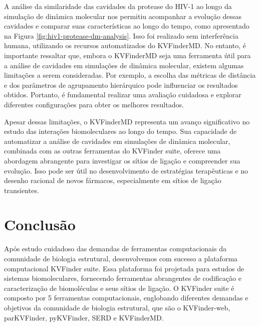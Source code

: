 \documentclass[Portugues]{phdquali}
\begin{document}
A análise da similaridade das cavidades da protease do HIV-1 ao longo da simulação de dinâmica molecular nos permitiu acompanhar a evolução dessas cavidades e comparar suas características ao longo do tempo, como apresentado na Figura \ref{fig:hiv1-protease-dm-analysis}. Isso foi realizado sem interferência humana, utilizando os recursos automatizados do KVFinderMD. No entanto, é importante ressaltar que, embora o KVFinderMD seja uma ferramenta útil para a análise de cavidades em simulações de dinâmica molecular, existem algumas limitações a serem consideradas. Por exemplo, a escolha das métricas de distância e dos parâmetros de agrupamento hierárquico pode influenciar os resultados obtidos. Portanto, é fundamental realizar uma avaliação cuidadosa e explorar diferentes configurações para obter os melhores resultados. %

Apesar dessas limitações, o KVFinderMD representa um avanço significativo no estudo das interações biomoleculares ao longo do tempo. Sua capacidade de automatizar a análise de cavidades em simulações de dinâmica molecular, combinada com as outras ferramentas do KVFinder suite, oferece uma abordagem abrangente para investigar os sítios de ligação e compreender sua evolução. Isso pode ser útil no desenvolvimento de estratégias terapêuticas e no desenho racional de novos fármacos, especialmente em sítios de ligação transientes.



\chapter{Conclusão}

Após estudo cuidadoso das demandas de ferramentas computacionais da comunidade de biologia estrutural, desenvolvemos com sucesso a plataforma computacional KVFinder suite. Essa plataforma foi projetada para estudos de sistemas biomoleculares, fornecendo ferramentas abrangentes de codificação e caracterização de biomoléculas e seus sítios de ligação. O KVFinder suite é composto por 5 ferramentas computacionais, englobando diferentes demandas e objetivos da comunidade de biologia estrutural, que são o KVFinder-web, parKVFinder, pyKVFinder, SERD e KVFinderMD. 
\end{document}
